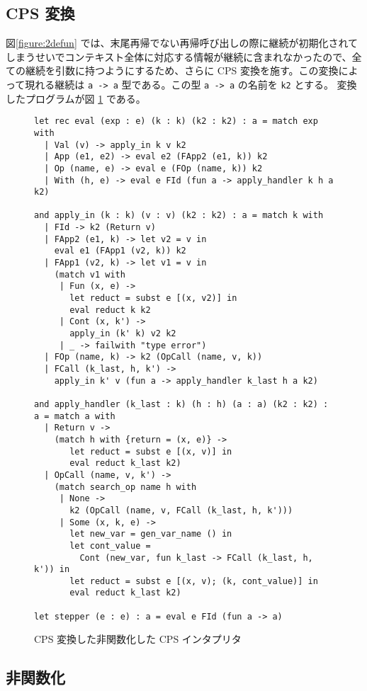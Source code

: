\subsection{CPS 変換}
\label{subsection:3cps}

図\ref{figure:2defun} では、末尾再帰でない再帰呼び出しの際に継続が初期化されてしまうせいでコンテキスト全体に対応する情報が継続に含まれなかったので、全ての継続を引数に持つようにするため、さらに CPS 変換を施す。この変換によって現れる継続は \texttt{a -> a} 型である。この型 \texttt{a -> a} の名前を \texttt{k2} とする。
変換したプログラムが図 \ref{figure:3cps} である。

\begin{figure}
\begin{verbatim}
let rec eval (exp : e) (k : k) (k2 : k2) : a = match exp with
  | Val (v) -> apply_in k v k2
  | App (e1, e2) -> eval e2 (FApp2 (e1, k)) k2
  | Op (name, e) -> eval e (FOp (name, k)) k2
  | With (h, e) -> eval e FId (fun a -> apply_handler k h a k2)

and apply_in (k : k) (v : v) (k2 : k2) : a = match k with
  | FId -> k2 (Return v)
  | FApp2 (e1, k) -> let v2 = v in
    eval e1 (FApp1 (v2, k)) k2
  | FApp1 (v2, k) -> let v1 = v in
    (match v1 with
     | Fun (x, e) ->
       let reduct = subst e [(x, v2)] in
       eval reduct k k2
     | Cont (x, k') ->
       apply_in (k' k) v2 k2
     | _ -> failwith "type error")
  | FOp (name, k) -> k2 (OpCall (name, v, k))
  | FCall (k_last, h, k') ->
    apply_in k' v (fun a -> apply_handler k_last h a k2)

and apply_handler (k_last : k) (h : h) (a : a) (k2 : k2) : a = match a with
  | Return v ->
    (match h with {return = (x, e)} ->
       let reduct = subst e [(x, v)] in
       eval reduct k_last k2)
  | OpCall (name, v, k') ->
    (match search_op name h with
     | None ->
       k2 (OpCall (name, v, FCall (k_last, h, k')))
     | Some (x, k, e) ->
       let new_var = gen_var_name () in
       let cont_value =
         Cont (new_var, fun k_last -> FCall (k_last, h, k')) in
       let reduct = subst e [(x, v); (k, cont_value)] in
       eval reduct k_last k2)

let stepper (e : e) : a = eval e FId (fun a -> a)
\end{verbatim}
\caption{CPS 変換した非関数化した CPS インタプリタ}
\label{figure:3cps}
\end{figure}

\subsection{非関数化}
\label{subsection:4defun}

